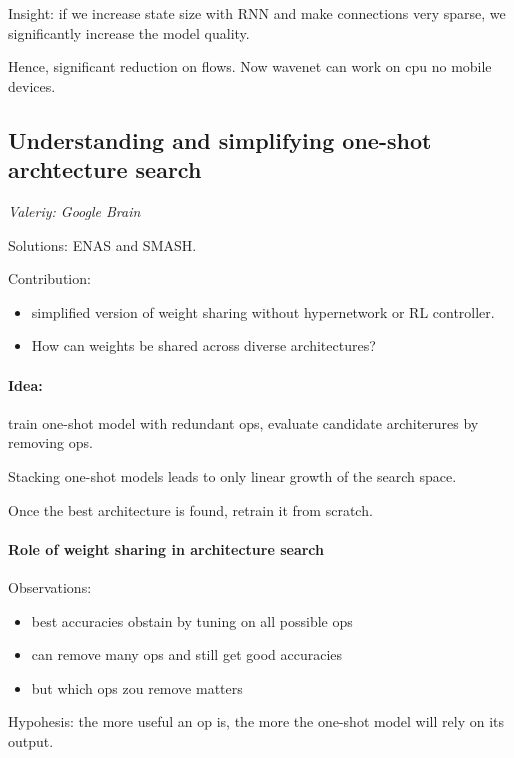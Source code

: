\documentclass[11pt,oneside,a4paper]{scrartcl}
\newcommand{\valeriy}[1]{{\color{blue}\textit{Valeriy: #1}}}
\begin{document}
Insight: if we increase state size with RNN and make connections very
sparse, we significantly increase the model quality.

Hence, significant reduction on flows. Now wavenet can work on cpu no
mobile devices.

\subsection{Understanding and simplifying one-shot archtecture search
  \cite{bender18a}}
\label{sec:underst-simpl-one}

\valeriy{Google Brain}

Solutions: ENAS and SMASH.

Contribution:
\begin{itemize}
\item simplified version of weight sharing without hypernetwork or RL
  controller.
  
\item How can weights be shared across diverse architectures?
\end{itemize}

\paragraph{Idea:}
 train one-shot model with redundant ops, evaluate candidate architerures
 by removing ops.

Stacking one-shot models leads to only linear growth of the search
space.

Once the best architecture is found, retrain it from scratch.

\paragraph{Role of weight sharing in architecture search}

Observations:
\begin{itemize}
\item best accuracies obstain by tuning on all possible ops

\item can remove many ops and still get good accuracies
  
\item but which ops zou remove matters
\end{itemize}

Hypohesis: the more useful an op is, the more the one-shot model
will rely on its output.
\end{document}
